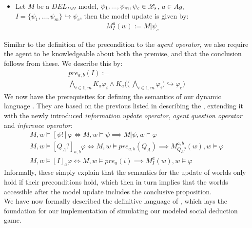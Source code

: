 \begin{itemize}
	\item Let $M$ be a $DEL_{IMI}$ model, $\psi_1,...,\psi_m, \psi_c \in \mathscr{L}_s$, $a\in Ag$, $I=\{\psi_1,...,\psi_m\} \hookrightarrow \psi_c$, then the model update is given by: 
	\begin{gather}
		M^a_I(w) := M|\psi_c
	\end{gather}
\end{itemize} 
Similar to the definition of the precondition to the \textit{agent operator}, we also require the agent to be knowledgeable about both the premise, and that the conclusion follows from these. We describe this by:
\begin{gather}
	\nonumber pre_{a,b}(I) := \\ \bigwedge\limits_{i\in1,m}K_a\varphi_i \land K_a\Biggl(\Biggl(\:\bigwedge\limits_{i\in 1,m}\varphi_i\Biggr) \hookrightarrow \varphi_c \Biggr)
\end{gather}
We now have the prerequisites for defining the semantics of our dynamic language \dynlang. They are based on the previous listed in  describing the \staticlang, extending it with the newly introduced \textit{information update operator}, \textit{agent question operator} and \textit{inference operator}:
\begin{gather}
	M, w \models [\psi!]\varphi \iff M, w \models \psi \implies M|\psi, w \models \varphi \\
	M, w \models [Q_A?]_{a,b}\varphi \iff M, w \models pre_{a,b}(Q_A) \implies M^{a,b}_{Q_A?}(w), w \models \varphi \\
	M, w \models [I]_a\varphi \iff M, w \models pre_a(i) \implies M^a_I(w), w \models \varphi
\end{gather}
Informally, these simply explain that the semantics for the update of worlds only hold if their preconditions hold, which then in turn implies that the worlds accessible after the model update includes the conclusive proposition. \\

We have now formally described the definitive language of \dynlang, which lays the foundation for our  implementation of simulating our modeled social deduction game. 


